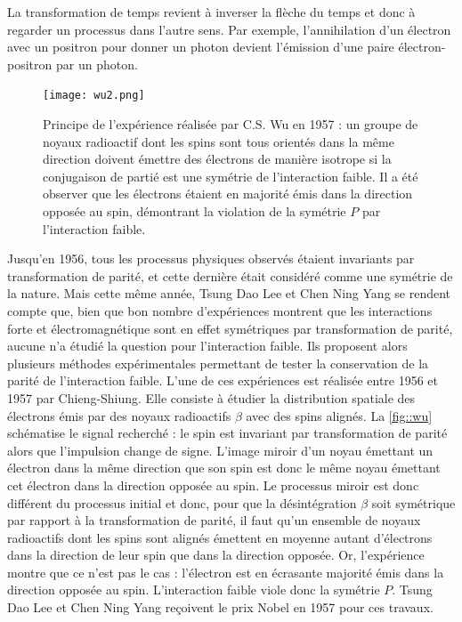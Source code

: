 			La transformation de temps revient à inverser la flèche du temps et donc à regarder un processus dans l'autre sens. Par exemple, l'annihilation d'un électron avec un positron pour donner un photon devient l'émission d'une paire électron-positron par un photon.
			
			\begin{figure}
				\texttt{[image: wu2.png]}
				\caption[Principe de l'expérience réalisée par C.S. Wu en 1957.]{\label{fig::wu}Principe de l'expérience réalisée par C.S. Wu en 1957 : un groupe de noyaux radioactif dont les spins sont tous orientés dans la même direction doivent émettre des électrons de manière isotrope si la conjugaison de partié est une symétrie de l'interaction faible. Il a été observer que les électrons étaient en majorité émis dans la direction opposée au spin, démontrant la violation de la symétrie $P$ par l'interaction faible.}
			\end{figure}
			Jusqu'en 1956, tous les processus physiques observés étaient invariants par transformation de parité, et cette dernière était considéré comme une symétrie de la nature. Mais cette même année, Tsung Dao Lee et Chen Ning Yang\cite{Lee1956} se rendent compte que, bien que bon nombre d'expériences montrent que les interactions forte et électromagnétique sont en effet symétriques par transformation de parité, aucune n'a étudié la question pour l'interaction faible. Ils proposent alors plusieurs méthodes expérimentales permettant de tester la conservation de la parité de l'interaction faible. L'une de ces expériences est réalisée entre 1956 et 1957 par Chieng-Shiung. Elle consiste à étudier la distribution spatiale des électrons émis par des noyaux radioactifs $\beta$ avec des spins alignés. La \autoref{fig::wu} schématise le signal recherché : le spin est invariant par transformation de parité alors que l'impulsion change de signe. L'image miroir d'un noyau émettant un électron dans la même direction que son spin est donc le même noyau émettant cet électron dans la direction opposée au spin. Le processus miroir est donc différent du processus initial et donc, pour que la désintégration $\beta$ soit symétrique par rapport à la transformation de parité, il faut qu'un ensemble de noyaux radioactifs dont les spins sont alignés émettent en moyenne autant d'électrons dans la direction de leur spin que dans la direction opposée. Or, l'expérience montre que ce n'est pas le cas : l'électron est en écrasante majorité émis dans la direction opposée au spin\cite{Wu1957}. L'interaction faible viole donc la symétrie $P$. Tsung Dao Lee et Chen Ning Yang reçoivent le prix Nobel en 1957 pour ces travaux.
			
